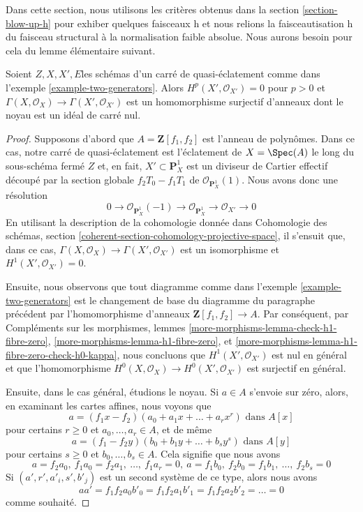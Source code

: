 \noindent
Dans cette section, nous utilisons les critères obtenus dans la
section \ref{section-blow-up-h}
pour exhiber quelques faisceaux h et nous relions la faisceautisation h
du faisceau structural à la normalisation faible absolue.
Nous aurons besoin pour cela du lemme élémentaire suivant.

\begin{lemma}
\label{lemma-funny-blow-up}
Soient $Z, X, X', E$\newline les schémas d'un carré de quasi-éclatement comme dans
l'exemple \ref{example-two-generators}.
Alors $H^p(X', \mathcal{O}_{X'}) = 0$ pour $p > 0$ et\newline
$\Gamma(X, \mathcal{O}_X) \to \Gamma(X', \mathcal{O}_{X'})$
est un homomorphisme surjectif d'anneaux dont le noyau est un idéal de carré nul.
\end{lemma}

\begin{proof}
Supposons d'abord que $A = \mathbf{Z}[f_1, f_2]$ est l'anneau de polynômes.
Dans ce cas, notre carré de quasi-éclatement est l'éclatement de $X = \Spec(A)$
le long du sous-schéma fermé $Z$ et, en fait, $X' \subset \mathbf{P}^1_X$
est un diviseur de Cartier effectif découpé par la section globale
$f_2T_0 - f_1 T_1$ de $\mathcal{O}_{\mathbf{P}^1_X}(1)$.
Nous avons donc une résolution
$$
0 \to
\mathcal{O}_{\mathbf{P}^1_X}(-1) \to
\mathcal{O}_{\mathbf{P}^1_X} \to
\mathcal{O}_{X'} \to
0
$$
En utilisant la description de la cohomologie donnée dans
Cohomologie des schémas, section
\ref{coherent-section-cohomology-projective-space},
il s'ensuit que, dans ce cas,
$\Gamma(X, \mathcal{O}_X) \to \Gamma(X', \mathcal{O}_{X'})$
est un isomorphisme et $H^1(X', \mathcal{O}_{X'}) = 0$.

\medskip\noindent
Ensuite, nous observons que tout diagramme comme dans l'exemple \ref{example-two-generators}
est le changement de base du diagramme du paragraphe précédent par
l'homomorphisme d'anneaux $\mathbf{Z}[f_1, f_2] \to A$. Par conséquent, par Compléments sur les morphismes, lemmes
\ref{more-morphisms-lemma-check-h1-fibre-zero},
\ref{more-morphisms-lemma-h1-fibre-zero}, et
\ref{more-morphisms-lemma-h1-fibre-zero-check-h0-kappa},
nous concluons que $H^1(X', \mathcal{O}_{X'})$ est nul en général
et que l'homomorphisme
$H^0(X, \mathcal{O}_X) \to H^0(X', \mathcal{O}_{X'})$ est surjectif en général.

\medskip\noindent
Ensuite, dans le cas général, étudions le noyau. Si
$a \in A$ s'envoie sur zéro, alors, en examinant les cartes affines,
nous voyons que
$$
a = (f_1x - f_2)(a_0 + a_1x + \ldots + a_rx^r)\text{ dans }A[x]
$$
pour certains $r \geq 0$ et $a_0, \ldots, a_r \in A$, et de même
$$
a = (f_1 - f_2y)(b_0 + b_1y + \ldots + b_s y^s)\text{ dans }A[y]
$$
pour certains $s \geq 0$ et $b_0, \ldots, b_s \in A$. Cela signifie que nous
avons
$$
a = f_2 a_0,\ f_1 a_0 = f_2 a_1,\ \ldots,\ f_1 a_r = 0,
\ a = f_1 b_0,\ f_2 b_0 = f_1 b_1,\ \ldots,\ f_2 b_s = 0
$$
Si $(a', r', a'_i, s', b'_j)$ est un second système de ce type, alors nous avons
$$
aa' = f_1f_2a_0b'_0 = f_1f_2a_1b'_1 = f_1f_2a_2b'_2 = \ldots = 0
$$
comme souhaité.
\end{proof}

